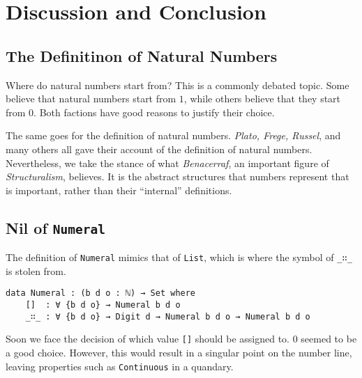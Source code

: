 \documentclass[\main/thesis.tex]{subfiles}
\begin{document}
\chapter{Discussion and Conclusion}\label{conclusion}

\section{The Definitinon of Natural Numbers}

Where do natural numbers start from?
This is a commonly debated topic.
Some believe that natural numbers start from $ 1 $,
while others believe that they start from $ 0 $.
Both factions have good reasons to justify their choice.

The same goes for the definition of natural numbers.
\textit{Plato, Frege, Russel}, and many others all gave their account of the
definition of natural numbers.
Nevertheless, we take the stance of what \textit{Benacerraf},
an important figure of \textit{Structuralism}, believes\cite{benacerraf1965numbers}.
It is the abstract structures that numbers represent that is important,
rather than their ``internal'' definitions.

\section{Nil of \lstinline|Numeral|}

The definition of \lstinline|Numeral| mimics that of \lstinline|List|,
which is where the symbol of \lstinline|_∷_| is stolen from.

\begin{lstlisting}[basicstyle=\ttfamily\scriptsize]
data Numeral : (b d o : ℕ) → Set where
    []  : ∀ {b d o} → Numeral b d o
    _∷_ : ∀ {b d o} → Digit d → Numeral b d o → Numeral b d o
\end{lstlisting}

Soon we face the decision of which value \lstinline|[]| should be assigned to.
$ 0 $ seemed to be a good choice.
However, this would result in a singular point on the number line,
leaving properties such as \lstinline|Continuous| in a quandary.
\end{document}
